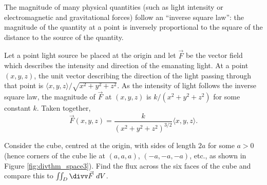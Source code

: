 {The magnitude of many physical quantities (such as light intensity or electromagnetic and gravitational forces) follow an ``inverse square law'': the magnitude of the quantity at a point is inversely proportional to the square of the distance to the source of the quantity. 

Let a point light source be placed at the origin and let $\vec F$ be the vector field which describes the intensity and direction of the emanating light. At a point $(x,y,z)$, the unit vector describing the direction of the light passing through that point is $\langle x,y,z\rangle/\sqrt{x^2+y^2+z^2}$. As the intensity of light follows the inverse square law, the magnitude of $\vec F$ at $(x,y,z)$ is $k/(x^2+y^2+z^2)$ for some constant $k$. Taken together, 
\[
\vec F(x,y,z) = \frac{k}{(x^2+y^2+z^2)^{3/2}}\langle x,y,z\rangle.
\]

Consider the cube, centred at the origin, with sides of length $2a$ for some $a>0$ (hence corners of the cube lie at $(a,a,a)$, $(-a,-a,-a)$, etc., as shown in Figure \ref{fig:divthm_space3}). Find the flux across the six faces of the cube and compare this to $\iint_D \divv\vec F\ dV$.
}
